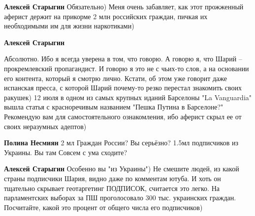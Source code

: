 \begin{itemize}
\begin{itemize}
 
\textbf{Алексей Старыгин} Обязательно) Меня очень забавляет, как этот прожженный аферист держит на прикорме 2 млн российских граждан, пичкая их необходимыми им для жизни наркотиками)

 
\textbf{Алексей Старыгин} 

Абсолютно. Ибо я всегда уверена в том, что говорю. А говорю я, что Шарий –
прокремлевский пропагандист. И говорю я это не с чьих-то слов, а на основании
его контента, который я смотрю лично. Кстати, об этом уже говорит даже
испанская пресса, с которой Шарий почему-то резко перестал знакомить своих
ракушек) 12 июля в одном из самых крупных иданий Барселоны "La Vanguardia"
вышла статья с красноречивым названием "Пешка Путина в Барселоне?" Рекомендую
вам для самостоятельного ознакомления, ибо аферист скрыл ее от своих неразумных
адептов)

 
\textbf{Полина Несмиян} 2 мл Граждан России? Вы серьёзно? 1.5мл подписчиков из Украины. Вы там Совсем с ума сходите?

 
\textbf{Алексей Старыгин} Особенно вы "из Украины") Не смешите людей, из какой
страны подписчики Шария, видно даже по комментам ютуба. И хоть он тщательно
скрывает геотаргетинг ПОДПИСОК, считается это легко. На парламентских выборах
за ПШ проголосовало 300 тыс. украинских граждан. Посчитайте, какой это процент
от общего числа его подписчиков)

 

\end{itemize}
\end{itemize}

